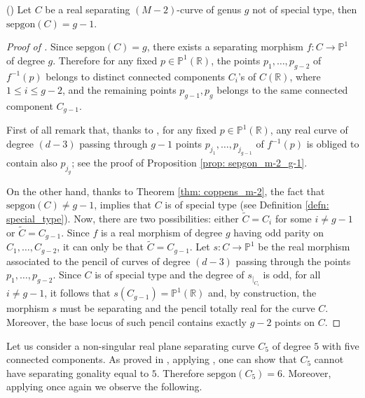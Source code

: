 \begin{thm}(\cite[Theorem 4.4]{Copp14})
	\label{thm: coppens_m-2}
	Let $C$ be a real separating $(M-2)$-curve of genus $g$ not of special type, then $\text{sepgon}(C)=g-1$.
\end{thm}
\begin{proof}[Proof of ]
	Since $\text{sepgon}(C)=g$, there exists a separating morphism $f: C \rightarrow \mathbb P^1$ of degree $g$. Therefore for any fixed $p \in \mathbb P^1(\mathbb R)$, the points $p_1, \dots, p_{g-2}$ of $f^{-1}(p)$ belongs to distinct connected components $C_i$'s of $C(\mathbb R)$, where $1 \leq i \leq g-2$, and the remaining points $p_{g-1},p_g$ belongs to the same connected component $C_{g-1}$.
	
First of all remark that, thanks to , for any fixed $p \in \mathbb P^1 (\mathbb R)$, any real curve of degree $(d-3)$ passing through $g-1$ points $p_{j_1},\dots, p_{j_{g-1}}$ of $f^{-1}(p)$ is obliged to contain also $p_{j_{g}}$; see the proof of Proposition \ref{prop: sepgon_m-2_g-1}.

On the other hand, thanks to Theorem \ref{thm: coppens_m-2}, the fact that $\text{sepgon}(C)\not = g-1$, implies that $C$ is of special type (see Definition \ref{defn: special_type}). Now, there are two possibilities: either $\tilde C= C_i$ for some $i \not = g-1$ or  $\tilde C= C_{g-1}$. Since $f$ is a real morphism of degree $g$ having odd parity on $C_1, \dots, C_{g-2}$, it can only be that $\tilde C= C_{g-1}$. Let $s: C \rightarrow \mathbb P^1$ be the real morphism associated to the pencil of curves of degree $(d-3)$ passing through the points $p_1, \dots, p_{g-2}$. Since $C$ is of special type and the degree of $s_{|_{C_i}}$ is odd, for all $i\not = g-1$, it follows that $s(C_{g-1})= \mathbb P^1(\mathbb R)$ and, by construction, the morphism $s$ must be separating and the pencil totally real for the curve $C$. Moreover, the base locus of such pencil contains exactly $g-2$ points on $C$.

\end{proof}


Let us consider a non-singular real plane separating curve $C_5$ of degree $5$ with five connected components. As proved in \cite[Example 2.2]{Manz23}, applying , one can show that $C_5$ cannot have separating gonality equal to $5$. Therefore $\text{sepgon}(C_5)=6$. Moreover, applying  once again we observe the following.


